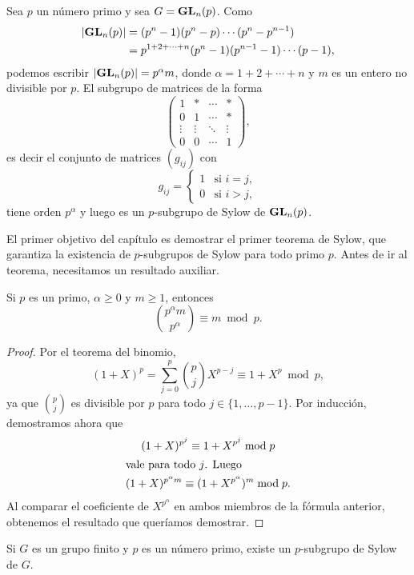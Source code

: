 \begin{example}
Sea $p$ un número primo y sea 
$G=\mathbf{GL}_n(p)$. Como 
\begin{align*}
|\mathbf{GL}_n(p)|&=(p^n-1)(p^n-p)\cdots (p^n-p^{n-1})\\
&=p^{1+2+\cdots+n}(p^n-1)(p^{n-1}-1)\cdots (p-1),
\end{align*}
podemos escribir $|\mathbf{GL}_n(p)|=p^\alpha m$, donde $\alpha=1+2+\cdots+n$ y $m$ es un entero no divisible por $p$. El subgrupo
de matrices de la forma 
\[
\begin{pmatrix}
1 & * & \cdots & *\\
0 & 1 & \cdots & *\\
\vdots & \vdots & \ddots & \vdots\\
0 & 0 & \cdots & 1 	
\end{pmatrix},
\]
es decir el conjunto de matrices $(g_{ij})$ con 
\[
g_{ij}=\begin{cases}
1 & \text{si $i=j$},\\
0 & \text{si $i>j$},
\end{cases}
\]
tiene orden $p^\alpha$ y luego es un $p$-subgrupo de Sylow de $\mathbf{GL}_n(p)$. 
\end{example}

El primer objetivo del capítulo es demostrar el primer teorema de Sylow, que garantiza la existencia de $p$-subgrupos de Sylow para todo primo $p$. 
Antes de ir al teorema, necesitamos un resultado auxiliar.

\begin{lemma}
	Si $p$ es un primo, $\alpha\geq0$ y $m\geq 1$, entonces 
	\[
	\binom{p^\alpha m}{p^\alpha}\equiv m\bmod p.
	\]
\end{lemma}

\begin{proof}
	Por el teorema del binomio, 
	\[
	(1+X)^p=\sum_{j=0}^p\binom{p}{j}X^{p-j}\equiv 1+X^p\bmod p,
	\]
	ya que $\binom{p}{j}$ es divisible por $p$ para todo $j\in\{1,\dots,p-1\}$. 
	Por inducción, demostramos ahora que 
	\begin{gather*}
	(1+X)^{p^j}\equiv 1+X^{p^j}\bmod p	\\
	\shortintertext{vale para todo $j$. Luego}
	(1+X)^{p^\alpha m}\equiv (1+X^{p^\alpha})^m\bmod p.
	\end{gather*}
Al comparar el coeficiente de $X^{p^\alpha}$ en ambos miembros de la fórmula anterior, obtenemos el resultado que queríamos demostrar.
\end{proof}

\begin{theorem}
Si $G$ es un grupo finito y $p$ es un número primo, existe un $p$-subgrupo de Sylow de $G$. 
\end{theorem}

